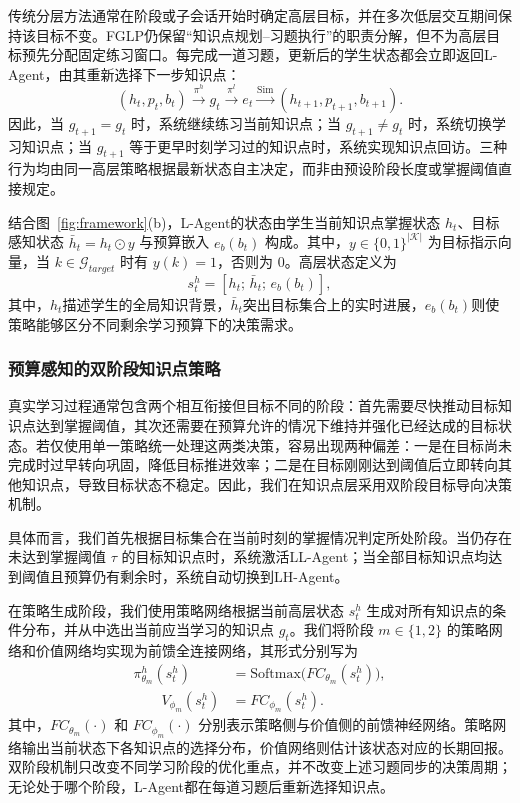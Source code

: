 \documentclass[11pt,a4paper]{article}
\begin{document}
传统分层方法通常在阶段或子会话开始时确定高层目标，并在多次低层交互期间保持该目标不变。FGLP仍保留“知识点规划--习题执行”的职责分解，但不为高层目标预先分配固定练习窗口。每完成一道习题，更新后的学生状态都会立即返回L-Agent，由其重新选择下一步知识点：
\begin{equation}
(h_t,p_t,b_t)
\xrightarrow{\pi^h}
g_t
\xrightarrow{\pi^l}
e_t
\xrightarrow{\mathrm{Sim}}
(h_{t+1},p_{t+1},b_{t+1}).
\end{equation}
因此，当 $g_{t+1}=g_t$ 时，系统继续练习当前知识点；当 $g_{t+1}\neq g_t$ 时，系统切换学习知识点；当 $g_{t+1}$ 等于更早时刻学习过的知识点时，系统实现知识点回访。三种行为均由同一高层策略根据最新状态自主决定，而非由预设阶段长度或掌握阈值直接规定。

结合图~\ref{fig:framework}(b)，L-Agent的状态由学生当前知识点掌握状态 $h_t$、目标感知状态 $\bar{h}_t=h_t\odot y$ 与预算嵌入 $e_b(b_t)$ 构成。其中，$y\in\{0,1\}^{|\mathcal{K}|}$ 为目标指示向量，当 $k\in\mathcal{G}_{target}$ 时有 $y(k)=1$，否则为 $0$。高层状态定义为
\begin{equation}
s_t^h=[h_t;\,\bar{h}_t;\,e_b(b_t)],
\end{equation}
其中，$h_t$描述学生的全局知识背景，$\bar{h}_t$突出目标集合上的实时进展，$e_b(b_t)$则使策略能够区分不同剩余学习预算下的决策需求。

\subsubsection{预算感知的双阶段知识点策略}

真实学习过程通常包含两个相互衔接但目标不同的阶段：首先需要尽快推动目标知识点达到掌握阈值，其次还需要在预算允许的情况下维持并强化已经达成的目标状态。若仅使用单一策略统一处理这两类决策，容易出现两种偏差：一是在目标尚未完成时过早转向巩固，降低目标推进效率；二是在目标刚刚达到阈值后立即转向其他知识点，导致目标状态不稳定。因此，我们在知识点层采用双阶段目标导向决策机制。

具体而言，我们首先根据目标集合在当前时刻的掌握情况判定所处阶段。当仍存在未达到掌握阈值 $\tau$ 的目标知识点时，系统激活LL-Agent；当全部目标知识点均达到阈值且预算仍有剩余时，系统自动切换到LH-Agent。

在策略生成阶段，我们使用策略网络根据当前高层状态 $s_t^h$ 生成对所有知识点的条件分布，并从中选出当前应当学习的知识点 $g_t$。我们将阶段 $m\in\{1,2\}$ 的策略网络和价值网络均实现为前馈全连接网络，其形式分别写为
\begin{equation}
\begin{aligned}
\pi_{\theta_m}^h( s_t^h)
&=
\mathrm{Softmax}\!\big(FC_{\theta_m}(s_t^h)\big),\\
\qquad
V_{\phi_m}(s_t^h)&=FC_{\phi_m}(s_t^h).
\end{aligned}
\end{equation}
其中，$FC_{\theta_m}(\cdot)$ 和 $FC_{\phi_m}(\cdot)$ 分别表示策略侧与价值侧的前馈神经网络。策略网络输出当前状态下各知识点的选择分布，价值网络则估计该状态对应的长期回报。双阶段机制只改变不同学习阶段的优化重点，并不改变上述习题同步的决策周期；无论处于哪个阶段，L-Agent都在每道习题后重新选择知识点。
\end{document}
